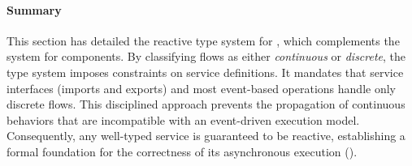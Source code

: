 \paragraph{Summary}

This section has detailed the reactive type system for \GRFRP, which complements the system for
\GRSync components. By classifying flows as either \emph{continuous} or \emph{discrete}, the type
system imposes constraints on service definitions. It mandates that service interfaces (\ie imports
and exports) and most event-based operations handle only discrete flows. This disciplined approach
prevents the propagation of continuous behaviors that are incompatible with an event-driven
execution model. Consequently, any well-typed service is guaranteed to be reactive, establishing a
formal foundation for the correctness of its asynchronous execution
(\cf {}).
